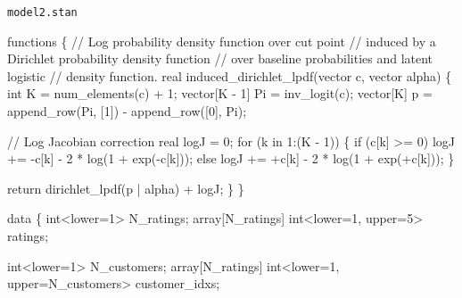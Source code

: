 \documentclass[
  letterpaper,
  DIV=11,
  numbers=noendperiod]{scrartcl}
\newenvironment{Shaded}{\begin{snugshade}}{\end{snugshade}}
\newcommand{\CommentTok}[1]{\textcolor[rgb]{0.37,0.37,0.37}{#1}}
\newcommand{\ControlFlowTok}[1]{\textcolor[rgb]{0.00,0.23,0.31}{#1}}
\newcommand{\DataTypeTok}[1]{\textcolor[rgb]{0.68,0.00,0.00}{#1}}
\newcommand{\DecValTok}[1]{\textcolor[rgb]{0.68,0.00,0.00}{#1}}
\newcommand{\KeywordTok}[1]{\textcolor[rgb]{0.00,0.23,0.31}{#1}}
\newcommand{\NormalTok}[1]{\textcolor[rgb]{0.00,0.23,0.31}{#1}}
\begin{document}
\begin{codelisting}

\caption{\texttt{model2.stan}}

\begin{Shaded}
\begin{Highlighting}[]
\KeywordTok{functions}\NormalTok{ \{}
  \CommentTok{// Log probability density function over cut point}
  \CommentTok{// induced by a Dirichlet probability density function}
  \CommentTok{// over baseline probabilities and latent logistic}
  \CommentTok{// density function.}
  \DataTypeTok{real}\NormalTok{ induced\_dirichlet\_lpdf(}\DataTypeTok{vector}\NormalTok{ c, }\DataTypeTok{vector}\NormalTok{ alpha) \{}
    \DataTypeTok{int}\NormalTok{ K = num\_elements(c) + }\DecValTok{1}\NormalTok{;}
    \DataTypeTok{vector}\NormalTok{[K {-} }\DecValTok{1}\NormalTok{] Pi = inv\_logit(c);}
    \DataTypeTok{vector}\NormalTok{[K] p = append\_row(Pi, [}\DecValTok{1}\NormalTok{]\textquotesingle{}) {-} append\_row([}\DecValTok{0}\NormalTok{]\textquotesingle{}, Pi);}

    \CommentTok{// Log Jacobian correction}
    \DataTypeTok{real}\NormalTok{ logJ = }\DecValTok{0}\NormalTok{;}
    \ControlFlowTok{for}\NormalTok{ (k }\ControlFlowTok{in} \DecValTok{1}\NormalTok{:(K {-} }\DecValTok{1}\NormalTok{)) \{}
      \ControlFlowTok{if}\NormalTok{ (c[k] \textgreater{}= }\DecValTok{0}\NormalTok{)}
\NormalTok{        logJ += {-}c[k] {-} }\DecValTok{2}\NormalTok{ * log(}\DecValTok{1}\NormalTok{ + exp({-}c[k]));}
      \ControlFlowTok{else}
\NormalTok{        logJ += +c[k] {-} }\DecValTok{2}\NormalTok{ * log(}\DecValTok{1}\NormalTok{ + exp(+c[k]));}
\NormalTok{    \}}

    \ControlFlowTok{return}\NormalTok{ dirichlet\_lpdf(p | alpha) + logJ;}
\NormalTok{  \}}
\NormalTok{\}}

\KeywordTok{data}\NormalTok{ \{}
  \DataTypeTok{int}\NormalTok{\textless{}}\KeywordTok{lower}\NormalTok{=}\DecValTok{1}\NormalTok{\textgreater{} N\_ratings;}
  \DataTypeTok{array}\NormalTok{[N\_ratings] }\DataTypeTok{int}\NormalTok{\textless{}}\KeywordTok{lower}\NormalTok{=}\DecValTok{1}\NormalTok{, }\KeywordTok{upper}\NormalTok{=}\DecValTok{5}\NormalTok{\textgreater{} ratings;}

  \DataTypeTok{int}\NormalTok{\textless{}}\KeywordTok{lower}\NormalTok{=}\DecValTok{1}\NormalTok{\textgreater{} N\_customers;}
  \DataTypeTok{array}\NormalTok{[N\_ratings] }\DataTypeTok{int}\NormalTok{\textless{}}\KeywordTok{lower}\NormalTok{=}\DecValTok{1}\NormalTok{, }\KeywordTok{upper}\NormalTok{=N\_customers\textgreater{} customer\_idxs;}


\end{Highlighting}
\end{Shaded}
\end{codelisting}
\end{document}
